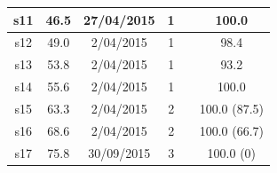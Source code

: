 \begin{table}
\begin{tabular}{|c|c|c|c|c|c|}
\hline
s11                                                 & 46.5                                                    & 27/04/2015                                                & 1                                                       &                         & 100.0                                                                   \\ 
\hline
s12                                                 & 49.0                                                    & 2/04/2015                                                 & 1                                                       &                         & 98.4                                                                    \\ 
\hline
s13                                                 & 53.8                                                    & 2/04/2015                                                 & 1                                                       &                         & 93.2                                                                    \\ 
\hline
s14                                                 & 55.6                                                    & 2/04/2015                                                 & 1                                                       &                         & 100.0                                                                   \\ 
\hline
s15                                                 & 63.3                                                    & 2/04/2015                                                 & 2                                                       &                         & 100.0 (87.5)                                                            \\ 
\hline
s16                                                 & 68.6                                                    & 2/04/2015                                                 & 2                                                       &                         & 100.0 (66.7)                                                            \\ 
\hline
s17                                                 & 75.8                                                    & 30/09/2015                                                & 3                                                       &                         & 100.0 (0)                                                               \\ 

\end{tabular}
\end{table}
